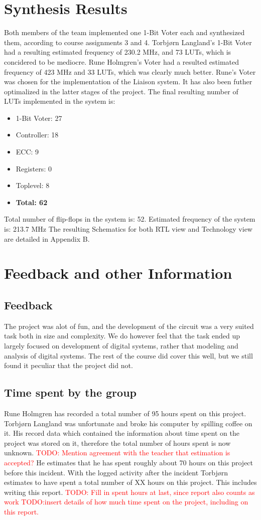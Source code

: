 \documentclass[a4paper]{IEEEtran}
\newcommand\TODO[1]{\textcolor{red}{TODO:#1}}
\newcommand\todo[1]{\TODO{#1}}
\begin{document}
\section{Synthesis Results}
Both members of the team implemented one 1-Bit Voter each and synthesized them, according to course assignments 3 and 4.
Torbjørn Langland's 1-Bit Voter had a resulting estimated frequency of 230.2 MHz, and 73 LUTs, which is concidered to be mediocre.
Rune Holmgren's Voter had a resulted estimated frequency of 423 MHz and 33 LUTs, which was clearly much better.
Rune's Voter was chosen for the implementation of the Liaison system.
It has also been futher optimalized in the latter stages of the project.
The final resulting number of LUTs implemented in the system is:
\begin{itemize}
    \item 1-Bit Voter: 27
    \item Controller: 18
    \item ECC: 9
    \item Registers: 0
    \item Toplevel: 8
    \item \textbf{Total: 62}
\end{itemize}
Total number of flip-flops in the system is: 52.
\break
Estimated frequency of the system is: 213.7 MHz
\break
The resulting Schematics for both RTL view and Technology view are detailed in Appendix B.

\section{Feedback and other Information}
\subsection{Feedback}
The project was alot of fun, and the development of the circuit was a very suited task both in size and complexity.
We do however feel that the task ended up largely focused on development of digital systems, rather that modeling and analysis of digital systems.
The rest of the course did cover this well, but we still found it peculiar that the project did not.

\subsection{Time spent by the group}
Rune Holmgren has recorded a total number of 95 hours spent on this project.
\break
Torbjørn Langland was unfortunate and broke his computer by spilling coffee on it.
His record data which contained the information about time spent on the project was stored on it, therefore the total number of hours spent is now unknown.
\todo{ Mention agreement with the teacher that estimation is accepted?}
He estimates that he has spent roughly about 70 hours on this project before this incident.
With the logged activity after the incident Torbjørn estimates to have spent a total number of XX hours on this project.
This includes writing this report.
\todo{ Fill in spent hours at last, since report also counts as work}
\todo{insert details of how much time spent on the project, including on this report.}
\end{document}
